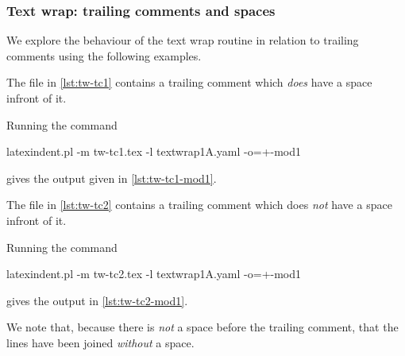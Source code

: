 \subsubsection{Text wrap: trailing comments and spaces}
 We explore the behaviour of the text wrap routine in relation to trailing comments using
 the following examples.

 \begin{example}
 The file in \cref{lst:tw-tc1} contains a trailing comment which \emph{does} have a space
 infront of it.

 Running the command

 \begin{commandshell}
latexindent.pl -m tw-tc1.tex -l textwrap1A.yaml -o=+-mod1 
\end{commandshell}

 gives the output given in \cref{lst:tw-tc1-mod1}.

 \begin{cmhtcbraster}[raster column skip=.1\linewidth]
 \end{cmhtcbraster}
 \end{example}

 \begin{example}
 The file in \cref{lst:tw-tc2} contains a trailing comment which does \emph{not} have a
 space infront of it.

 Running the command

 \begin{commandshell}
latexindent.pl -m tw-tc2.tex -l textwrap1A.yaml -o=+-mod1 
\end{commandshell}

 gives the output in \cref{lst:tw-tc2-mod1}.
 \begin{cmhtcbraster}[raster column skip=.1\linewidth]
 \end{cmhtcbraster}
 We note that, because there is \emph{not} a space before the trailing comment, that the
 lines have been joined \emph{without} a space.
 \end{example}

